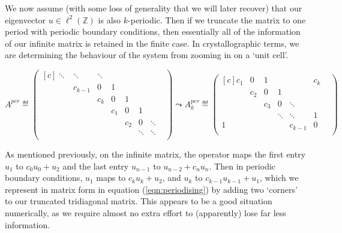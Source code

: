\documentclass[../main.tex]{subfiles}
\begin{document}
We now assume (with some loss of generality that we will later recover) that our
eigenvector $u \in \ell^2(\mathbb{Z})$ is also $k$-periodic. Then if we truncate
the matrix to one period with periodic boundary conditions, then essentially all
of the information of our infinite matrix is retained in the finite case. In
crystallographic terms, we are determining the behaviour of the system from
zooming in on a `unit cell'.

\begin{equation}
\label{eqn:periodising}
  A^{per} \eqdef
  \begin{pmatrix*}[c]
    \ddots & \ddots & \ddots & & & & \\
    & c_{k-1} & 0 & 1 & & & & \\
    & & c_{k} & 0 & 1 & & & \\
    & & & c_1 & 0 & 1 & \\
    & & &  & c_2 & 0 & \ddots \\
    & & & & & \ddots & \ddots & \\
  \end{pmatrix*}
  \leadsto 
  A^{per}_k \eqdef
  \begin{pmatrix*}[c]
    c_1 & 0 & 1 & & & c_{k}\\
    & c_2 & 0 & 1 & & & \\
    & & c_3 & 0 & \ddots & & \\
    & & & \ddots & \ddots & 1 & \\
    1 & & & & c_{k-1} & 0\\ 
  \end{pmatrix*}
\end{equation}

As mentioned previously, on the infinite matrix, the operator maps the first
entry $u_1$ to $c_0 u_0 + u_2$ and the last entry $u_{n-1}$ to $u_{n-2} + c_{n}
u_{n}$. Then in periodic boundary conditions, $u_1$ maps to $c_k u_k + u_2$, and
$u_{k}$ to $c_{k-1} u_{k-1} + u_{1}$, which we represent in matrix form in
equation (\ref{eqn:periodising}) by adding two `corners' to our truncated
tridiagonal matrix. This appears to be a good situation numerically, as we
require almost no extra effort to (apparently) lose far less information.\\
\end{document}
